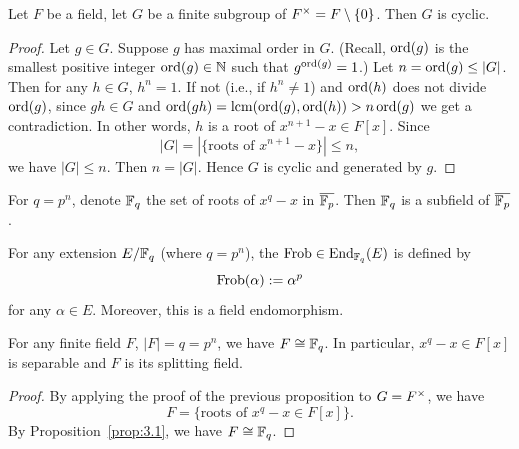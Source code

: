 \begin{proposition}\label{prop:5.1}
Let $F$ be a field, let $G$ be a finite subgroup of
$F^{\times}=F\setminus\{0\}$. Then $G$ is cyclic.
\end{proposition}

\begin{proof}
Let $g\in G$. Suppose $g$ has maximal order in $G$. (Recall, $\operatorname{ord}(g)$
is the smallest positive integer $\operatorname{ord}(g)\in\mathbb{N}$ such that
$g^{\operatorname{ord}(g)}=1$.) Let $n=\operatorname{ord}(g)\leq|G|$. Then for any $h\in G$,
$h^{n}=1$. If not (i.e., if $h^{n}\neq1$) and $\operatorname{ord}(h)$ does not
divide $\operatorname{ord}(g)$, since $gh\in G$ and $\operatorname{ord}(gh)=\operatorname{lcm}(\operatorname{ord}(g),\operatorname{ord}(h))>n\operatorname{ord}(g)$
we get a contradiction. In other words, $h$ is a root of $x^{n+1}-x\in F[x]$.
Since
\begin{equation}
|G|=|\{\mbox{roots of }x^{n+1}-x\}|\leq n,
\end{equation}
we have $|G|\leq n$. Then $n=|G|$. Hence $G$ is cyclic and generated
by $g$.
\end{proof}

\begin{notation}
For $q=p^{n}$, denote $\mathbb{F}_{q}$ the set of roots of $x^{q}-x$ in
$\overline{\mathbb{F}_{p}}$. Then $\mathbb{F}_{q}$ is a subfield of $\overline{\mathbb{F}_{p}}$.
\end{notation}

\begin{definition}
For any extension $E/\mathbb{F}_{q}$ (where $q=p^{n}$), the 
$\operatorname{Frob}\in\operatorname{End}_{\mathbb{F}_{q}}(E)$ is defined by
\begin{equation}
\operatorname{Frob}(\alpha):=\alpha^{p}
\end{equation}
for any $\alpha\in E$. Moreover, this is a field endomorphism.
\end{definition}

\begin{corollary}\label{cor:5.2}
For any finite field $F$, $|F|=q=p^{n}$, we have $F\cong\mathbb{F}_{q}$. In
particular, $x^{q}-x\in F[x]$ is separable and $F$ is its splitting field.
\end{corollary}

\begin{proof}
By applying the proof of the previous proposition to
$G=F^{\times}$, we have
\begin{equation}
F=\{\mbox{roots of }x^{q}-x\in F[x]\}.
\end{equation}
By Proposition~\ref{prop:3.1}, we have $F\cong\mathbb{F}_{q}$.
\end{proof}

